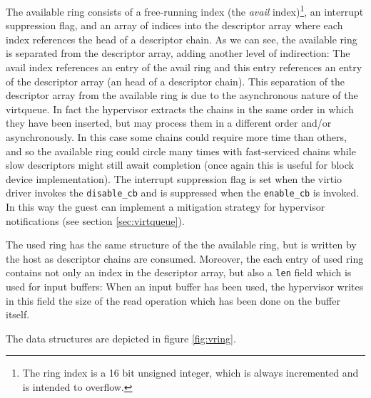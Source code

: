 The available ring consists of a free-running index (the \emph{avail} index)\footnote{The ring index is a 16 bit unsigned integer, 
which is always incremented and is intended to overflow.}, an interrupt suppression flag, and an array of indices into the descriptor array 
where each index references the head of a descriptor chain. As we can see, the available ring is separated from the descriptor array, 
adding another level of indirection: The avail index references an entry of the avail ring and this entry references an entry of the
descriptor array (an head of a descriptor chain).
This separation of the descriptor array from the available ring is due to the asynchronous nature of the virtqueue. In fact the hypervisor
extracts the chains in the same order in which they have been inserted, but may process them in a different order and/or asynchronously.
In this case some chains could require more time than others, and so the available ring could circle many times with fast-serviced
chains while slow descriptors might still await completion (once again this is useful for block device implementation).
The interrupt suppression flag is set when the virtio driver invokes the \texttt{disable\_cb} and is suppressed when the
\texttt{enable\_cb} is invoked. In this way the guest can implement a mitigation strategy for hypervisor notifications (see section 
\ref{sec:virtqueue}).

The used ring has the same structure of the the available ring, but is written by the host as descriptor chains are consumed. Moreover,
the each entry of used ring contains not only an index in the descriptor array, but also a \texttt{len} field which is used for input
buffers: When an input buffer has been used, the hypervisor writes in this field the size of the read operation which has been done on 
the buffer itself.

The data structures are depicted in figure \ref{fig:vring}.

